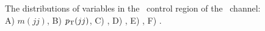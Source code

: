 \begin{figure}[htbp]
{    
  }
  \caption[\qrkt\qrktbar\ Control Region Distributions for the \ZnnH\ Channel]{The distributions of variables in the \qrkt\qrktbar\ control region of the \ZnnH\ channel: A) $m(jj)$, B) $p_{\mathrm{T}}(jj)$, C) \btagmax, D) \btagmin, E) \pTjmax, F) \pTjmin.}
  \label{fig:CR_Znn_TT_1}
\end{figure}

\clearpage

